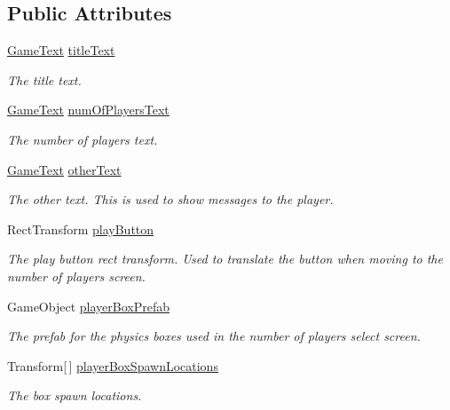 \subsection*{Public Attributes}
\begin{DoxyCompactItemize}
\item 
\hyperlink{class_multi_stack_1_1_game_text}{Game\+Text} \hyperlink{class_multi_stack_1_1_main_menu_a6fd09504dbf98f1464f65e15d897e8e4}{title\+Text}
\begin{DoxyCompactList}\small\item\em The title text. \end{DoxyCompactList}\item 
\hyperlink{class_multi_stack_1_1_game_text}{Game\+Text} \hyperlink{class_multi_stack_1_1_main_menu_a67a98e0ca8c571f820e68e586ba53072}{num\+Of\+Players\+Text}
\begin{DoxyCompactList}\small\item\em The number of players text. \end{DoxyCompactList}\item 
\hyperlink{class_multi_stack_1_1_game_text}{Game\+Text} \hyperlink{class_multi_stack_1_1_main_menu_ae6d2e9ea930343eeadd0d2405149d347}{other\+Text}
\begin{DoxyCompactList}\small\item\em The other text. This is used to show messages to the player. \end{DoxyCompactList}\item 
Rect\+Transform \hyperlink{class_multi_stack_1_1_main_menu_ad0770c7731b1bc84fe9214e576f84b1c}{play\+Button}
\begin{DoxyCompactList}\small\item\em The play button rect transform. Used to translate the button when moving to the number of players screen. \end{DoxyCompactList}\item 
Game\+Object \hyperlink{class_multi_stack_1_1_main_menu_a423b9ab552b7a5e2068b33e8276931ea}{player\+Box\+Prefab}
\begin{DoxyCompactList}\small\item\em The prefab for the physics boxes used in the number of players select screen. \end{DoxyCompactList}\item 
Transform\mbox{[}$\,$\mbox{]} \hyperlink{class_multi_stack_1_1_main_menu_af217845475c893bd3d6269933a269892}{player\+Box\+Spawn\+Locations}
\begin{DoxyCompactList}\small\item\em The box spawn locations. \end{DoxyCompactList}\end{DoxyCompactItemize}


